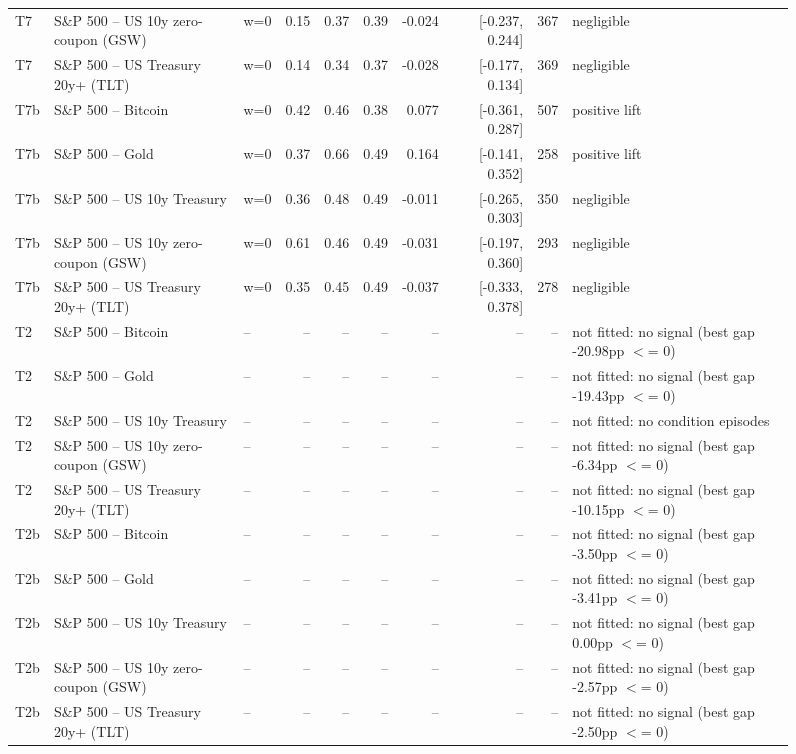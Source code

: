 \begin{figure}
\begin{tabular}{lllrrrrrrl}
T7 & S\&P 500 -- US 10y zero-coupon (GSW) & w=0 & 0.15 & 0.37 & 0.39 & -0.024 & [-0.237, 0.244] & 367 & negligible \\
T7 & S\&P 500 -- US Treasury 20y+ (TLT) & w=0 & 0.14 & 0.34 & 0.37 & -0.028 & [-0.177, 0.134] & 369 & negligible \\
T7b & S\&P 500 -- Bitcoin & w=0 & 0.42 & 0.46 & 0.38 & 0.077 & [-0.361, 0.287] & 507 & positive lift \\
T7b & S\&P 500 -- Gold & w=0 & 0.37 & 0.66 & 0.49 & 0.164 & [-0.141, 0.352] & 258 & positive lift \\
T7b & S\&P 500 -- US 10y Treasury & w=0 & 0.36 & 0.48 & 0.49 & -0.011 & [-0.265, 0.303] & 350 & negligible \\
T7b & S\&P 500 -- US 10y zero-coupon (GSW) & w=0 & 0.61 & 0.46 & 0.49 & -0.031 & [-0.197, 0.360] & 293 & negligible \\
T7b & S\&P 500 -- US Treasury 20y+ (TLT) & w=0 & 0.35 & 0.45 & 0.49 & -0.037 & [-0.333, 0.378] & 278 & negligible \\
T2 & S\&P 500 -- Bitcoin & -- & -- & -- & -- & -- & -- & -- & not fitted: no signal (best gap -20.98pp $<$= 0) \\
T2 & S\&P 500 -- Gold & -- & -- & -- & -- & -- & -- & -- & not fitted: no signal (best gap -19.43pp $<$= 0) \\
T2 & S\&P 500 -- US 10y Treasury & -- & -- & -- & -- & -- & -- & -- & not fitted: no condition episodes \\
T2 & S\&P 500 -- US 10y zero-coupon (GSW) & -- & -- & -- & -- & -- & -- & -- & not fitted: no signal (best gap -6.34pp $<$= 0) \\
T2 & S\&P 500 -- US Treasury 20y+ (TLT) & -- & -- & -- & -- & -- & -- & -- & not fitted: no signal (best gap -10.15pp $<$= 0) \\
T2b & S\&P 500 -- Bitcoin & -- & -- & -- & -- & -- & -- & -- & not fitted: no signal (best gap -3.50pp $<$= 0) \\
T2b & S\&P 500 -- Gold & -- & -- & -- & -- & -- & -- & -- & not fitted: no signal (best gap -3.41pp $<$= 0) \\
T2b & S\&P 500 -- US 10y Treasury & -- & -- & -- & -- & -- & -- & -- & not fitted: no signal (best gap 0.00pp $<$= 0) \\
T2b & S\&P 500 -- US 10y zero-coupon (GSW) & -- & -- & -- & -- & -- & -- & -- & not fitted: no signal (best gap -2.57pp $<$= 0) \\
T2b & S\&P 500 -- US Treasury 20y+ (TLT) & -- & -- & -- & -- & -- & -- & -- & not fitted: no signal (best gap -2.50pp $<$= 0) \\

\end{tabular}
\end{figure}
